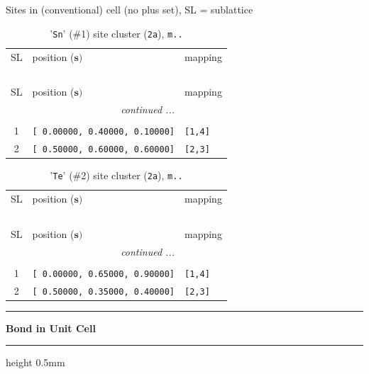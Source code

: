 \documentclass[fleqn,10pt,landscape]{jsarticle}
\begin{document}
\noindent Sites in (conventional) cell (no plus set), SL = sublattice

\renewcommand{\arraystretch}{1.6}
\begin{longtable}[l]{cll}
\captionsetup{justification=raggedright, singlelinecheck=off}
\caption{'\texttt{Sn}' (\#1) site cluster (\texttt{2a}), \texttt{m..}}
 \\
 \hline \hline
SL & position ($\bm{s})$ & mapping \\ \hline \endfirsthead

\multicolumn{2}{l}{\tablename\ \thetable{}} \\
 \hline \hline
SL & position ($\bm{s})$ & mapping \\ \hline \endhead

 \hline \hline
\multicolumn{2}{r}{\footnotesize\it continued ...} \\ \endfoot

 \hline \hline
\multicolumn{2}{r}{} \\ \endlastfoot

1 & \texttt{[ 0.00000, 0.40000, 0.10000]} & \texttt{[1,4]} \\ \hline
2 & \texttt{[ 0.50000, 0.60000, 0.60000]} & \texttt{[2,3]} \\
\end{longtable}
\renewcommand{\arraystretch}{1.6}
\begin{longtable}[l]{cll}
\captionsetup{justification=raggedright, singlelinecheck=off}
\caption{'\texttt{Te}' (\#2) site cluster (\texttt{2a}), \texttt{m..}}
 \\
 \hline \hline
SL & position ($\bm{s})$ & mapping \\ \hline \endfirsthead

\multicolumn{2}{l}{\tablename\ \thetable{}} \\
 \hline \hline
SL & position ($\bm{s})$ & mapping \\ \hline \endhead

 \hline \hline
\multicolumn{2}{r}{\footnotesize\it continued ...} \\ \endfoot

 \hline \hline
\multicolumn{2}{r}{} \\ \endlastfoot

1 & \texttt{[ 0.00000, 0.65000, 0.90000]} & \texttt{[1,4]} \\ \hline
2 & \texttt{[ 0.50000, 0.35000, 0.40000]} & \texttt{[2,3]} \\
\end{longtable}
\vspace{5mm}
\noindent \rule[0.5mm]{5mm}{0.5mm}\hspace{3mm}\textbf{Bond in Unit Cell}\hspace{3mm}\leaders\hrule height 0.5mm\hfill\kern0pt
\vspace{3mm}
\end{document}
